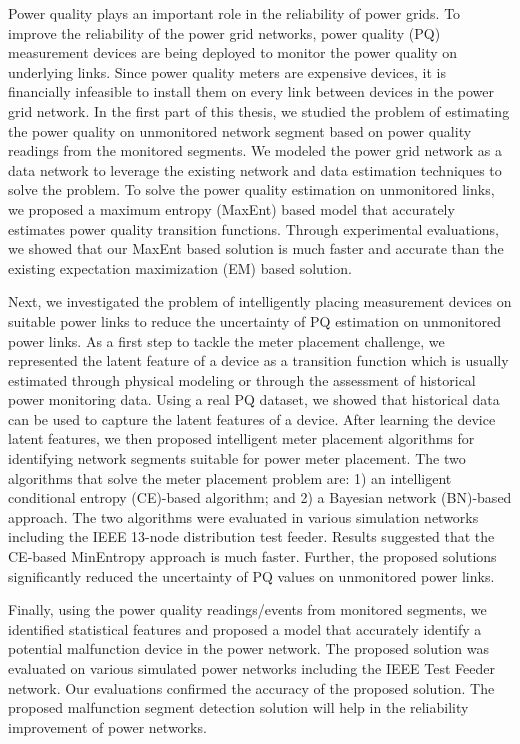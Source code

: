 \label{chap:conclusion}
Power quality plays an important role in the reliability of power grids. To improve the reliability of the power grid networks, power quality (PQ) measurement devices are being deployed to monitor the power quality on underlying links. Since power quality meters are expensive devices, it is financially infeasible to install them on every link between devices in the power grid network. In the first part of this thesis, we studied the problem of estimating the power quality on unmonitored network segment based on power quality readings from the monitored segments. We modeled the power grid network as a data network to leverage the existing network and data estimation techniques to solve the problem. To solve the power quality estimation on unmonitored links,  we proposed a maximum entropy (MaxEnt) based model that accurately estimates power quality transition functions. Through experimental evaluations, we showed that our MaxEnt based solution is much faster and accurate than the existing expectation maximization (EM) based solution.

Next, we investigated the problem of intelligently placing measurement devices on suitable power links to reduce the uncertainty of PQ estimation on unmonitored power links. As a first step to tackle the meter placement challenge, we represented the latent feature of a device as a transition function which is usually estimated through physical modeling or through the assessment of historical power monitoring data. Using a real PQ dataset, we showed that historical data can be used to capture the latent features of a device. After learning the device latent features, we then proposed intelligent meter placement algorithms for identifying network segments suitable for power meter placement. The two algorithms that solve the meter placement problem are: 1)  an intelligent conditional entropy (CE)-based algorithm; and 2) a Bayesian network (BN)-based approach. The two algorithms were evaluated in various simulation networks including the IEEE 13-node distribution test feeder. Results suggested that the CE-based MinEntropy approach is much faster. Further, the proposed solutions significantly reduced the uncertainty of PQ values on unmonitored power links.

Finally, using the power quality readings/events from monitored segments, we identified statistical features and proposed a model that accurately identify a potential malfunction device in the power network. The proposed solution was evaluated on various simulated power networks including the IEEE Test Feeder network. Our evaluations confirmed the accuracy of the proposed solution. The proposed malfunction segment detection solution will help in the reliability improvement of power networks.

